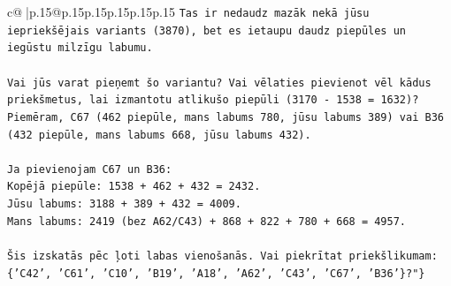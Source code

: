 \documentclass{article}
\begin{document}
{\begin{supertabular}{c@{$\;$}|p{.15\linewidth}@{}p{.15\linewidth}p{.15\linewidth}p{.15\linewidth}p{.15\linewidth}p{.15\linewidth}}
{{{\texttt{Tas ir nedaudz mazāk nekā jūsu iepriekšējais variants (3870), bet es ietaupu daudz piepūles un iegūstu milzīgu labumu.} \\
\\ 
\texttt{Vai jūs varat pieņemt šo variantu? Vai vēlaties pievienot vēl kādus priekšmetus, lai izmantotu atlikušo piepūli (3170 {-} 1538 = 1632)? Piemēram, C67 (462 piepūle, mans labums 780, jūsu labums 389) vai B36 (432 piepūle, mans labums 668, jūsu labums 432).} \\
\\ 
\texttt{Ja pievienojam C67 un B36:} \\
\texttt{Kopējā piepūle: 1538 + 462 + 432 = 2432.} \\
\texttt{Jūsu labums: 3188 + 389 + 432 = 4009.} \\
\texttt{Mans labums: 2419 (bez A62/C43) + 868 + 822 + 780 + 668 = 4957.} \\
\\ 
\texttt{Šis izskatās pēc ļoti labas vienošanās. Vai piekrītat priekšlikumam: \{'C42', 'C61', 'C10', 'B19', 'A18', 'A62', 'C43', 'C67', 'B36'\}?"\}} \\
            }
        }
    }
     \\ \\


\end{supertabular}}
\end{document}
